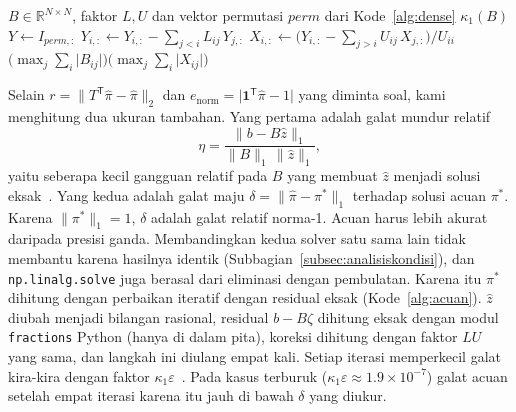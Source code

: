 \documentclass[12pt,a4paper]{article}
\newcommand{\R}{\mathbb{R}}
\newcommand{\T}{\mathsf{T}}
\numberwithin{equation}{section}
\begin{document}
\begin{algorithm}[H]
\caption{Bilangan kondisi $\kappa_1(B)$ dari faktor $PB=LU$}
\label{alg:kappa}
\begin{algorithmic}[1]
\Require $B\in\R^{N\times N}$, faktor $L,U$ dan vektor permutasi $\mathit{perm}$ dari Kode~\ref{alg:dense}
\Ensure $\kappa_1(B)$
\State $Y\gets I_{\mathit{perm},:}$ 
 
  \State $Y_{i,:}\gets Y_{i,:}-\sum_{j<i}L_{ij}\,Y_{j,:}$
\EndFor
{} 
  \State $X_{i,:}\gets\bigl(Y_{i,:}-\sum_{j>i}U_{ij}\,X_{j,:}\bigr)/U_{ii}$
\EndFor
\State \Return $\bigl(\max_j\sum_i\lvert B_{ij}\rvert\bigr)\bigl(\max_j\sum_i\lvert X_{ij}\rvert\bigr)$
\end{algorithmic}
\end{algorithm}

Selain $r=\lVert T^\T\hat\pi-\hat\pi\rVert_2$ dan $e_{\mathrm{norm}}=\lvert\mathbf1^\T\hat\pi-1\rvert$ yang diminta
soal, kami menghitung dua ukuran tambahan. Yang pertama adalah galat mundur relatif
\begin{equation}\label{eq:eta}
\eta=\frac{\lVert b-B\hat z\rVert_1}{\lVert B\rVert_1\,\lVert\hat z\rVert_1},
\end{equation}
yaitu seberapa kecil gangguan relatif pada $B$ yang membuat $\hat z$ menjadi solusi eksak~\cite{higham}. Yang kedua
adalah galat maju $\delta=\lVert\hat\pi-\pi^\ast\rVert_1$ terhadap solusi acuan $\pi^\ast$. Karena
$\lVert\pi^\ast\rVert_1=1$, $\delta$ adalah galat relatif norma-1. Acuan harus lebih akurat daripada presisi ganda.
Membandingkan kedua solver satu sama lain tidak membantu karena hasilnya identik (Subbagian~\ref{subsec:analisiskondisi}),
dan \texttt{np.linalg.solve} juga berasal dari eliminasi dengan pembulatan. Karena itu $\pi^\ast$ dihitung dengan
perbaikan iteratif dengan residual eksak (Kode~\ref{alg:acuan}). $\hat z$ diubah menjadi bilangan rasional, residual
$b-B\zeta$ dihitung eksak dengan modul \texttt{fractions} Python (hanya di dalam pita), koreksi dihitung dengan faktor
$LU$ yang sama, dan langkah ini diulang empat kali. Setiap iterasi memperkecil galat kira-kira dengan faktor
$\kappa_1\varepsilon$~\cite{higham}. Pada kasus terburuk ($\kappa_1\varepsilon\approx1.9\times10^{-7}$) galat acuan
setelah empat iterasi karena itu jauh di bawah $\delta$ yang diukur.
\end{document}
